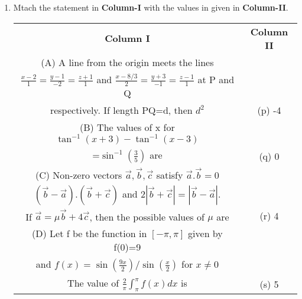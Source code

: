 \begin{enumerate}[label=\arabic*.,ref=\thesubsection.\theenumi]
\item Mtach the statement in \textbf{Column-I} with the values in given in \textbf{Column-II}.
\begin{table}[ht!]
\centering
\begin{tabular}{c c} 
 \textbf{Column I} & \textbf{Column II}\\ [0.5ex] 
 (A) A line from the origin meets the lines\\
     $\frac{x-2}{1}=\frac{y-1}{-2}=\frac{z+1}{1}$ and
     $\frac{x-8/3}{2}=\frac{y+3}{-1}=\frac{z-1}{1}$ at
     P and Q\\ respectively. If length PQ=d, then $d^2$                                  &(p) -4\\ 
 (B) The values of x for
      $\tan^{-1}(x+3)-\tan^{-1}(x-3)$\\=$\sin^{-1}(\frac{3}{5})$ are                     &(q) 0\\
 (C) Non-zero vectors $\overrightarrow{a}, \overrightarrow{b}, 
     \overrightarrow{c}$ satisfy $\overrightarrow{a}.\overrightarrow{b}=0$\\
     $(\overrightarrow{b}-\overrightarrow{a}).(\overrightarrow{b}+\overrightarrow{c})$ and 
     $2|\overrightarrow{b}+\overrightarrow{c}|=|\overrightarrow{b}-\overrightarrow{a}|$.\\ 
     If $\overrightarrow{a}=\mu\overrightarrow{b}+4\overrightarrow{c}$,
     then the possible values of $\mu$ are                                               &(r) 4\\
 (D) Let f be the function in $[-\pi, \pi]$ given by f(0)=9\\
     and $f(x)=\sin(\frac{9x}{2})/\sin(\frac{x}{2})$ for $x \neq 0$\\
     The value of $\frac{2}{\pi}\int_{\pi}^{\pi}f(x)dx$ is                               &(s) 5\\[1ex]
                                                            
\end{tabular}
\end{table}


\end{enumerate}
